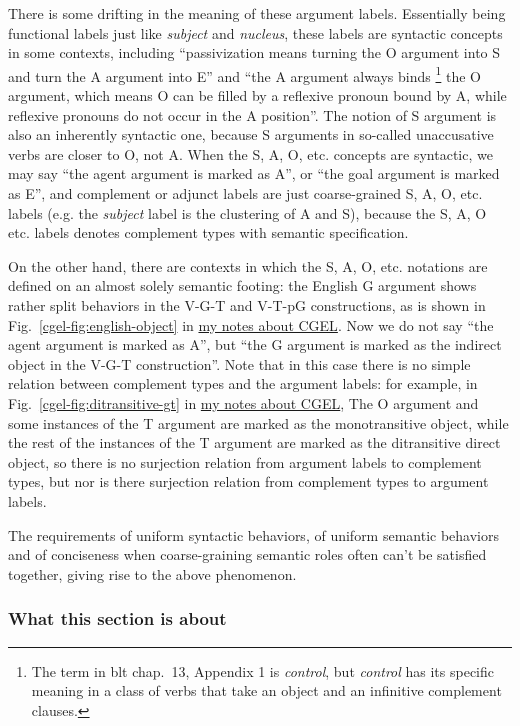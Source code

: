 \documentclass[UTF8, a4paper, oneside, scheme=plain]{ctexart}
\newcommand*{\citechap}[1]{chap.~{#1}}
\newcommand*{\citefig}[1]{Fig.~{#1}}
\newcommand*{\term}[1]{\emph{#1}}
\newcommand{\cgel}{\href{../English/cambridge.pdf}{my notes about CGEL}}
\begin{document}
There is some drifting in the meaning of these argument labels.
Essentially being functional labels just like \term{subject} and \term{nucleus},
these labels are syntactic concepts in some contexts,
including ``passivization means turning the O argument into S and turn the A argument into E''
and ``the A argument always binds%
\footnote{
    The term in \ac{blt} \citechap{13}, Appendix 1 is \term{control},
    but \term{control} has its specific meaning in a class of verbs 
    that take an object and an infinitive complement clauses.
}
the O argument, which means O can be filled by a reflexive pronoun bound by A,
while reflexive pronouns do not occur in the A position''.
The notion of S argument is also an inherently syntactic one,
because S arguments in so-called unaccusative verbs are closer to O, not A.
When the S, A, O, etc. concepts are syntactic,
we may say ``the agent argument is marked as A'',
or ``the goal argument is marked as E'',
and complement or adjunct labels are just coarse-grained S, A, O, etc. labels
(e.g. the \term{subject} label is the clustering of A and S), 
because the S, A, O etc. labels denotes complement types with semantic specification.

On the other hand, there are contexts in which the S, A, O, etc. notations 
are defined on an almost solely semantic footing:
the English G argument shows rather split behaviors in the V-G-T and V-T-pG constructions,
as is shown in \citefig{\ref{cgel-fig:english-object}} in \cgel.
Now we do not say ``the agent argument is marked as A'',
but ``the G argument is marked as the indirect object in the V-G-T construction''.
Note that in this case there is no simple relation between complement types and the argument labels:
for example, in \citefig{\ref{cgel-fig:ditransitive-gt}} in \cgel,
The O argument and some instances of the T argument are marked as the monotransitive object,
while the rest of the instances of the T argument are marked as the ditransitive direct object,
so there is no surjection relation from argument labels to complement types,
but nor is there surjection relation from complement types to argument labels.

The requirements of uniform syntactic behaviors, 
of uniform semantic behaviors and of conciseness
when coarse-graining semantic roles 
often can't be satisfied together,
giving rise to the above phenomenon.

\subsubsection{What this section is about}\label{sec:about-argument-structure-sec}
\end{document}
